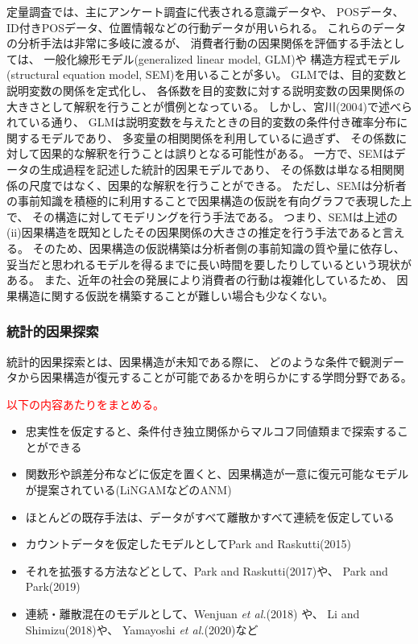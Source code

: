 定量調査では、主にアンケート調査に代表される意識データや、
POSデータ、ID付きPOSデータ、位置情報などの行動データが用いられる。
これらのデータの分析手法は非常に多岐に渡るが、
消費者行動の因果関係を評価する手法としては、
一般化線形モデル(generalized linear model, GLM)や
構造方程式モデル(structural equation model, SEM)を用いることが多い\cite{2015-pb}\cite{2009-qw}。
GLMでは、目的変数と説明変数の関係を定式化し、
各係数を目的変数に対する説明変数の因果関係の大きさとして解釈を行うことが慣例となっている。
しかし、宮川(2004)\cite{2004-qj}で述べられている通り、
GLMは説明変数を与えたときの目的変数の条件付き確率分布に関するモデルであり、
多変量の相関関係を利用しているに過ぎず、
その係数に対して因果的な解釈を行うことは誤りとなる可能性がある。
一方で、SEMはデータの生成過程を記述した統計的因果モデルであり、
その係数は単なる相関関係の尺度ではなく、因果的な解釈を行うことができる\cite{2004-qj}。
ただし、SEMは分析者の事前知識を積極的に利用することで因果構造の仮説を有向グラフで表現した上で、
その構造に対してモデリングを行う手法である。
つまり、SEMは上述の(ii)因果構造を既知としたその因果関係の大きさの推定を行う手法であると言える。
そのため、因果構造の仮説構築は分析者側の事前知識の質や量に依存し、
妥当だと思われるモデルを得るまでに長い時間を要したりしているという現状がある。
また、近年の社会の発展により消費者の行動は複雑化しているため、
因果構造に関する仮説を構築することが難しい場合も少なくない。


\subsubsection{統計的因果探索}

統計的因果探索とは、因果構造が未知である際に、
どのような条件で観測データから因果構造が復元することが可能であるかを明らかにする学問分野である。

\textcolor{red}{以下の内容あたりをまとめる。}
\begin{itemize}
  \item 忠実性を仮定すると、条件付き独立関係からマルコフ同値類まで探索することができる
  \item 関数形や誤差分布などに仮定を置くと、因果構造が一意に復元可能なモデルが提案されている(LiNGAMなどのANM)
  \item ほとんどの既存手法は、データがすべて離散かすべて連続を仮定している
  \item カウントデータを仮定したモデルとしてPark and Raskutti(2015)\cite{Park2015-tj}
  \item それを拡張する方法などとして、Park and Raskutti(2017)\cite{Park2017-hw}や、
        Park and Park(2019)\cite{Park2019-qy}
  \item 連続・離散混在のモデルとして、Wenjuan \textit{et al.}(2018)\cite{Wenjuan2018-nm} や、
        Li and Shimizu(2018)\cite{Li2018-aw}や、
        Yamayoshi \textit{et al.}(2020)\cite{Yamayoshi2020-gu}など
\end{itemize}
